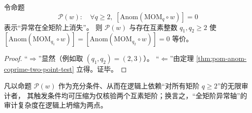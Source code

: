 \begin{theorem}\label{thm:pom-anom-all-moments-collapse-to-two}
令命题
\[
\mathcal P(w):\quad \forall q\ge 2,\;[\mathrm{Anom}(\mathrm{MOM}_q\circ w)]=0
\]
表示“异常在全矩阶上消失”。
则 \(\mathcal P(w)\) 与存在互素整数 \(q_1,q_2\ge 2\) 使
\(
[\mathrm{Anom}(\mathrm{MOM}_{q_1}\circ w)]=[\mathrm{Anom}(\mathrm{MOM}_{q_2}\circ w)]=0
\)
等价。
\end{theorem}
\begin{proof}
“\(\Rightarrow\)”显然（例如取 \((q_1,q_2)=(2,3)\)）。
“\(\Leftarrow\)”由定理 \ref{thm:pom-anom-coprime-two-point-test} 立得。证毕。
\end{proof}

\begin{corollary}\label{cor:pom-anom-oracle-collapse-two-point-trigger}
凡以命题 \(\mathcal P(w)\) 作为充分条件、从而在逻辑上依赖“对所有矩阶 \(q\ge 2\)”的无限审计者，
其触发条件均可压缩为仅核验两个互素矩阶；换言之，“全矩阶异常轴”的审计复杂度在逻辑上坍缩为两点。
\end{corollary}

